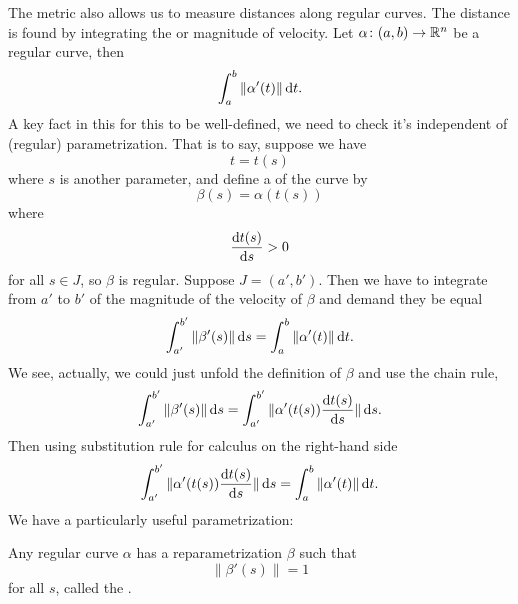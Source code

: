 The metric also allows us to measure distances along regular curves. The
distance is found by integrating the  or magnitude of
velocity. Let $\alpha\colon(a,b)\to\mathbb{R}^{n}$ be a regular curve, then
\begin{equation}
\int^{b}_{a}\|\alpha'(t)\|\,\mathrm{d} t.
\end{equation}
A key fact in this for this to be well-defined, we need to check it's
independent of (regular) parametrization. That is to say, suppose we
have
\begin{equation}
t = t(s)
\end{equation}
where $s$ is another parameter, and define a 
of the curve by
\begin{equation}
\beta(s) = \alpha(t(s))
\end{equation}
where
\begin{equation}
\frac{\mathrm{d} t(s)}{\mathrm{d} s}>0
\end{equation}
for all $s\in J$, so $\beta$ is regular. Suppose $J=(a',b')$.
Then we have to integrate from $a'$ to $b'$ of the magnitude of the
velocity of $\beta$ and demand they be equal
\begin{equation}
\int^{b'}_{a'}\|\beta'(s)\|\,\mathrm{d} s = \int^{b}_{a}\|\alpha'(t)\|\,\mathrm{d} t.
\end{equation}
We see, actually, we could just unfold the definition of $\beta$ and use
the chain rule,
\begin{equation}
\int^{b'}_{a'}\|\beta'(s)\|\,\mathrm{d} s = \int^{b'}_{a'}\|\alpha'(t(s))\frac{\mathrm{d}
  t(s)}{\mathrm{d} s}\|\,\mathrm{d} s.
\end{equation}
Then using substitution rule for calculus on the right-hand side
\begin{equation}
\int^{b'}_{a'}\|\alpha'(t(s))\frac{\mathrm{d} t(s)}{\mathrm{d} s}\|\,\mathrm{d} s
 = \int^{b}_{a}\|\alpha'(t)\|\,\mathrm{d} t.
\end{equation}
We have a particularly useful parametrization:

\begin{proposition}
  Any regular curve $\alpha$ has a reparametrization $\beta$ such that
  \begin{equation}
\|\beta'(s)\|=1
  \end{equation}
  for all $s$, called the .
\end{proposition}

